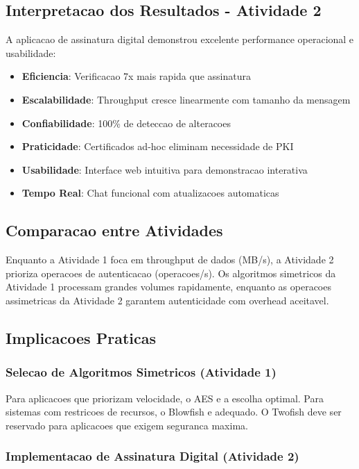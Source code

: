 \documentclass[12pt,a4paper,oneside]{article}
\begin{document}
\subsection{Interpretacao dos Resultados - Atividade 2}

A aplicacao de assinatura digital demonstrou excelente performance operacional e usabilidade:

\begin{itemize}
    \item \textbf{Eficiencia}: Verificacao 7x mais rapida que assinatura
    \item \textbf{Escalabilidade}: Throughput cresce linearmente com tamanho da mensagem
    \item \textbf{Confiabilidade}: 100\% de deteccao de alteracoes
    \item \textbf{Praticidade}: Certificados ad-hoc eliminam necessidade de PKI
    \item \textbf{Usabilidade}: Interface web intuitiva para demonstracao interativa
    \item \textbf{Tempo Real}: Chat funcional com atualizacoes automaticas
\end{itemize}

\subsection{Comparacao entre Atividades}

Enquanto a Atividade 1 foca em throughput de dados (MB/s), a Atividade 2 prioriza operacoes de autenticacao (operacoes/s). Os algoritmos simetricos da Atividade 1 processam grandes volumes rapidamente, enquanto as operacoes assimetricas da Atividade 2 garantem autenticidade com overhead aceitavel.

\subsection{Implicacoes Praticas}

\subsubsection{Selecao de Algoritmos Simetricos (Atividade 1)}

Para aplicacoes que priorizam velocidade, o AES e a escolha optimal. Para sistemas com restricoes de recursos, o Blowfish e adequado. O Twofish deve ser reservado para aplicacoes que exigem seguranca maxima.

\subsubsection{Implementacao de Assinatura Digital (Atividade 2)}
\end{document}
